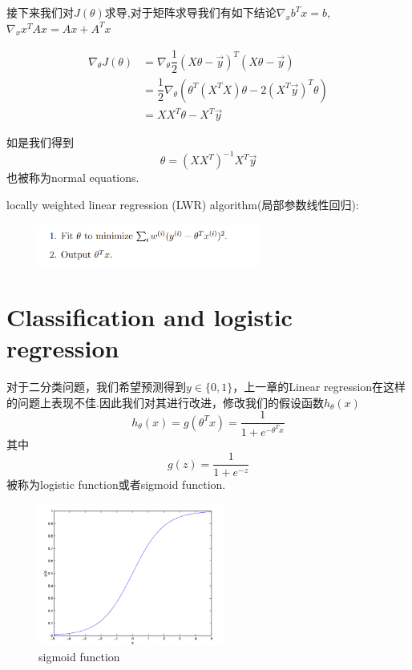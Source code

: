 \documentclass[12pt, a4paper, oneside]{ctexbook}
\begin{document}
接下来我们对$J(\theta)$求导,对于矩阵求导我们有如下结论$\nabla_{x}b^{T}x=b$,$\nabla_{x}x^{T}Ax=Ax+A^{T}x$

\begin{equation}
\begin{aligned}
\nabla_{\theta}J(\theta) &= \nabla_{\theta}\dfrac{1}{2}(X\theta - \vec{y})^{T}(X\theta - \vec{y}) \\
   &= \dfrac{1}{2}\nabla_{\theta}(\theta^T(X^{T}X)\theta-2(X^T\vec{y})^{T}\theta) \\
   &= XX^T\theta-X^T\vec{y}
\end{aligned}
\end{equation}

如是我们得到\[\theta=(XX^T)^{-1}X^T\vec{y}\]也被称为normal equations.

\hspace*{\fill}

locally weighted linear regression (LWR) algorithm(局部参数线性回归):

  \begin{figure}[h]
		\centering 
		\includegraphics[width=0.65\textwidth]{images24.png} 
	\end{figure}


\section{Classification and logistic regression}

对于二分类问题，我们希望预测得到$y\in \{0,1\}$，上一章的Linear regression在这样的问题上表现不佳.因此我们对其进行改进，修改我们的假设函数$h_{\theta}(x)$\[h_{\theta}(x)=g(\theta^{T}x)=\dfrac{1}{1+e^{-\theta^{T}x}}\]其中\[g(z)=\dfrac{1}{1+e^{-z}}\]被称为logistic function或者sigmoid function.

  \begin{figure}[h]
		\centering 
		\includegraphics[width=0.55\textwidth]{images25.png} 
		\caption{sigmoid function}
	\end{figure}
\end{document}
